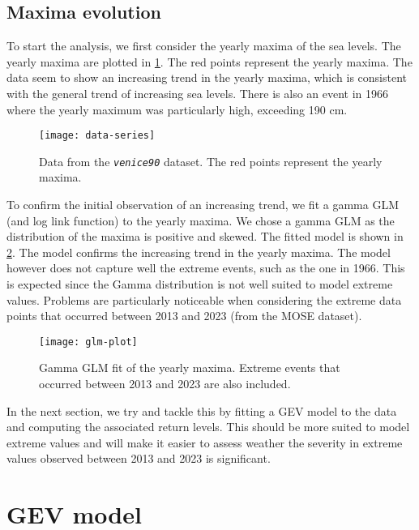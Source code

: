 \documentclass[a4paper, 12pt,oneside]{article}
\begin{document}
        \subsection{Maxima evolution}
        To start the analysis, we first consider the yearly maxima of the sea levels. The yearly maxima are plotted in \ref{fig:data-series}. The red points represent the yearly maxima. The data seem to show an increasing trend in the yearly maxima, which is consistent with the general trend of increasing sea levels. There is also an event in 1966 where the yearly maximum was particularly high, exceeding 190 cm.
        \begin{figure}[h!]
            \centering
            \vspace{0em}
            \texttt{[image: data-series]}
            \caption{Data from the \emph{\texttt{venice90}} dataset. The red points represent the yearly maxima.}
            \label{fig:data-series}
        \end{figure}
        To confirm the initial observation of an increasing trend, we fit a gamma GLM  (and log link function) to the yearly maxima. We chose a gamma GLM as the distribution of the maxima is positive and skewed. The fitted model is shown in \ref{fig:glm-plot}. The model confirms the increasing trend in the yearly maxima. The model however does not capture well the extreme events, such as the one in 1966. This is expected since the Gamma distribution is not well suited to model extreme values. Problems are particularly noticeable when considering the extreme data points that occurred between 2013 and 2023 (from the MOSE dataset).
        \begin{figure}[h!]
            \centering
            \vspace{0em}
            \texttt{[image: glm-plot]}
            \caption{Gamma GLM fit of the yearly maxima. Extreme events that occurred between 2013 and 2023 are also included.}
            \label{fig:glm-plot}
        \end{figure}
        In the next section, we try and tackle this by fitting a GEV model to the data and computing the associated return levels. This should be more suited to model extreme values and will make it easier to assess weather the severity in extreme values observed between 2013 and 2023 is significant.
    \section{GEV model}
\end{document}
